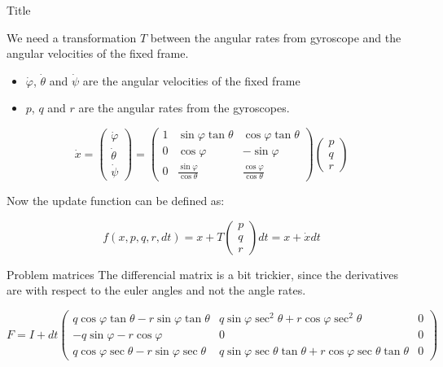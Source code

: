 \begin{frame}{Title}

We need a transformation $T$ between the angular rates from gyroscope and the angular velocities of the fixed frame. 
\begin{itemize}
\item $\dot{\varphi}$, $\dot{\theta}$ and $\dot{\psi}$ are the angular velocities of the fixed frame
\item $p$, $q$ and $r$ are the angular rates from the gyroscopes.
\end{itemize}

\begin{equation}
    \dot{x} =
    \begin{pmatrix}
        \dot{\varphi} \\
        \dot{\theta} \\
        \dot{\psi}
    \end{pmatrix}
    = \begin{pmatrix}
        1 & \sin \varphi \tan \theta & \cos \varphi \tan \theta \\
        0 & \cos \varphi & - \sin \varphi \\
        0 & \frac{\sin \varphi}{\cos \theta}  & \frac{\cos \varphi}{\cos \theta}
    \end{pmatrix}
    \begin{pmatrix}
        p \\
        q \\
        r
    \end{pmatrix}
\end{equation} 

Now the update function can be defined as:

\begin{equation}
f(x,p,q,r,dt) = x + T
\begin{pmatrix}
p \\ q \\ r
\end{pmatrix}
dt = x + \dot{x} dt
\end{equation}

\end{frame}


\begin{frame}{Problem matrices}
The differencial matrix is a bit trickier, since the derivatives are with respect to the euler angles and not the angle rates.

\fontsize{9pt}{10pt}\selectfont
\begin{equation}
   F = I + dt
   \begin{pmatrix}
       q \cos\varphi \tan\theta - r \sin\varphi \tan \theta &
       q \sin \varphi \sec^2 \theta + r \cos \varphi \sec^2 \theta &
       0 \\
       -q \sin \varphi - r \cos \varphi
       & 0 & 0 \\
       q \cos \varphi \sec \theta - r \sin \varphi \sec \theta &
       q \sin \varphi \sec \theta \tan \theta + r \cos\varphi \sec \theta \tan  \theta &
       0
   \end{pmatrix}
\end{equation}


\end{frame}


